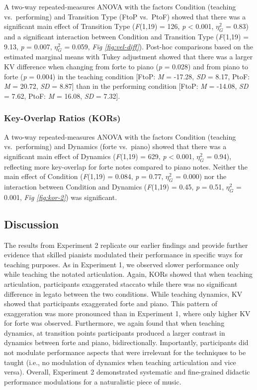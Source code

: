 \documentclass[
  man,floatsintext]{apa6}
\begin{document}
A two-way repeated-measures ANOVA with the factors Condition (teaching vs.~performing) and Transition Type (FtoP vs.~PtoF) showed that there was a significant main effect of Transition Type (\emph{F}(1,19) = 126, \emph{p} \textless{} 0.001, \(\eta_G^2\) = 0.83) and a significant interaction between Condition and Transition Type (\emph{F}(1,19) = 9.13, \emph{p} = 0.007, \(\eta_G^2\) = 0.059, \emph{Fig \ref{fig:vel-diff}}). Post-hoc comparisons based on the estimated marginal means with Tukey adjustment showed that there was a larger KV difference when changing from forte to piano (\emph{p} = 0.028) and from piano to forte (\emph{p} = 0.004) in the teaching condition {[}FtoP: \emph{M} = -17.28, \emph{SD} = 8.17, PtoF: \emph{M} = 20.72, \emph{SD} = 8.87{]} than in the performing condition {[}FtoP: \emph{M} = -14.08, \emph{SD} = 7.62, PtoF: \emph{M} = 16.08, \emph{SD} = 7.32{]}.

\hypertarget{key-overlap-ratios-kors-1}{%
\subsubsection{Key-Overlap Ratios (KORs)}\label{key-overlap-ratios-kors-1}}

A two-way repeated-measures ANOVA with the factors Condition (teaching vs.~performing) and Dynamics (forte vs.~piano) showed that there was a significant main effect of Dynamics (\emph{F}(1,19) = 629, \emph{p} \textless{} 0.001, \(\eta_G^2\) = 0.94), reflecting more key-overlap for forte notes compared to piano notes. Neither the main effect of Condition (\emph{F}(1,19) = 0.084, \emph{p} = 0.77, \(\eta_G^2\) = 0.000) nor the interaction between Condition and Dynamics (\emph{F}(1,19) = 0.45, \emph{p} = 0.51, \(\eta_G^2\) = 0.001, \emph{Fig \ref{fig:kor-2}}) was significant.

\hypertarget{discussion-1}{%
\subsection{Discussion}\label{discussion-1}}

The results from Experiment 2 replicate our earlier findings and provide further evidence that skilled pianists modulated their performance in specific ways for teaching purposes. As in Experiment 1, we observed slower performance only while teaching the notated articulation. Again, KORs showed that when teaching articulation, participants exaggerated staccato while there was no significant difference in legato between the two conditions. While teaching dynamics, KV showed that participants exaggerated forte and piano. This pattern of exaggeration was more pronounced than in Experiment 1, where only higher KV for forte was observed. Furthermore, we again found that when teaching dynamics, at transition points participants produced a larger contrast in dynamics between forte and piano, bidirectionally. Importantly, participants did not modulate performance aspects that were irrelevant for the techniques to be taught (i.e., no modulation of dynamics when teaching articulation and vice versa). Overall, Experiment 2 demonstrated systematic and fine-grained didactic performance modulations for a naturalistic piece of music.
\end{document}
